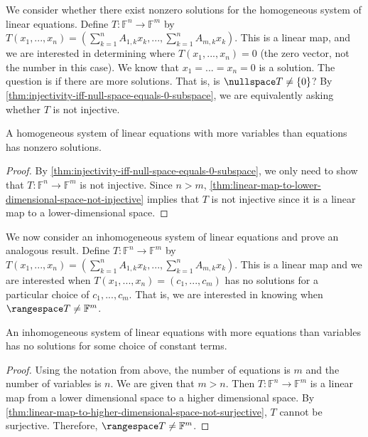 \documentclass{article}
\begin{document}
We consider whether there exist nonzero solutions for the homogeneous
system of linear equations. Define
$T: \mathbb{F}^n \rightarrow \mathbb{F}^m$ by
$T(x_1, ..., x_n) = (\sum_{k=1}^n A_{1, k} x_k, ..., \sum_{k=1}^n
A_{m, k} x_k)$. This is a linear map, and we are interested in
determining where $T(x_1, ..., x_n) = 0$ (the zero vector, not the
number in this case). We know that $x_1 = ... = x_n = 0$ is a
solution. The question is if there are more solutions. That is, is
$\nullspace T \ne \{0\}$? By
\cref{thm:injectivity-iff-null-space-equals-0-subspace}, we are
equivalently asking whether $T$ is not injective.

\begin{theorem}
  \label{thm:homogeneous-system-more-variables-than-equations}
  A homogeneous system of linear equations with more variables than
  equations has nonzero solutions.
\end{theorem}
\begin{proof}
  By \cref{thm:injectivity-iff-null-space-equals-0-subspace}, we only
  need to show that $T: \mathbb{F}^n \rightarrow \mathbb{F}^m$ is not
  injective. Since $n > m$,
  \cref{thm:linear-map-to-lower-dimensional-space-not-injective}
  implies that $T$ is not injective since it is a linear map to a
  lower-dimensional space.
\end{proof}

We now consider an inhomogeneous system of linear equations and prove
an analogous result. Define $T: \mathbb{F}^n \rightarrow
\mathbb{F}^m$ by $T(x_1, ..., x_n) = (\sum_{k=1}^n A_{1, k} x_k, ...,
\sum_{k=1}^n A_{m, k} x_k)$. This is a linear map and we are
interested when $T(x_1, ..., x_n) = (c_1, ..., c_m)$ has no solutions
for a particular choice of $c_1, ..., c_m$. That is, we are interested
in knowing when $\rangespace T \ne \mathbb{F}^m$. 

\begin{theorem}
  \label{thm:inhomogeneous-system-more-equations-than-variables}
  An inhomogeneous system of linear equations with more equations than
  variables has no solutions for some choice of constant terms.
\end{theorem}
\begin{proof}
  Using the notation from above, the number of equations is $m$ and
  the number of variables is $n$. We are given that $m > n$. Then $T:
  \mathbb{F}^n \rightarrow \mathbb{F}^m$ is a linear map from a lower
  dimensional space to a higher dimensional space. By
  \cref{thm:linear-map-to-higher-dimensional-space-not-surjective},
  $T$ cannot be surjective. Therefore, $\rangespace T \ne \mathbb{F}^m$.
\end{proof}
\end{document}
